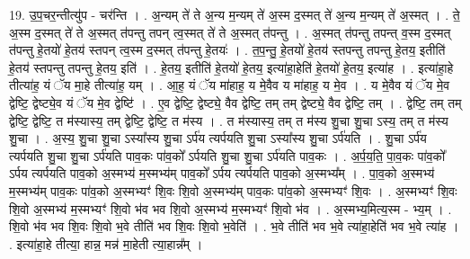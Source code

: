 \documentclass[17pt]{extarticle}
\begin{document}
19. उ॒प॒चर॒न्तीत्यु॑प - चर॑न्ति । . अ॒न्यम् ते॑ ते अ॒न्य म॒न्यम् ते॑ अ॒स्म द॒स्मत् ते॑ अ॒न्य म॒न्यम् ते॑ अ॒स्मत् । . ते॒ अ॒स्म द॒स्मत् ते॑ ते अ॒स्मत् त॑पन्तु तपन् त्व॒स्मत् ते॑ ते अ॒स्मत् त॑पन्तु । . अ॒स्मत् त॑पन्तु तपन्त् व॒स्म द॒स्मत् त॑पन्तु हे॒तयो॑ हे॒तय॑ स्तपन् त्व॒स्म द॒स्मत् त॑पन्तु हे॒तयः॑ । . त॒प॒न्तु॒ हे॒तयो॑ हे॒तय॑ स्तपन्तु तपन्तु हे॒तय॒ इतीति॑ हे॒तय॑ स्तपन्तु तपन्तु हे॒तय॒ इति॑ । . हे॒तय॒ इतीति॑ हे॒तयो॑ हे॒तय॒ इत्या॑हा॒हेति॑ हे॒तयो॑ हे॒तय॒ इत्या॑ह । . इत्या॑हा॒हे तीत्या॑ह॒ यं ॅय मा॒हे तीत्या॑ह॒ यम् । . आ॒ह॒ यं ॅय मा॑हाह॒ य मे॒वैव य मा॑हाह॒ य मे॒व । . य मे॒वैव यं ॅय मे॒व द्वेष्टि॒ द्वेष्ट्ये॒व यं ॅय मे॒व द्वेष्टि॑ । . ए॒व द्वेष्टि॒ द्वेष्ट्ये॒ वैव द्वेष्टि॒ तम् तम् द्वेष्ट्ये॒ वैव द्वेष्टि॒ तम् । . द्वेष्टि॒ तम् तम् द्वेष्टि॒ द्वेष्टि॒ त म॑स्यास्य॒ तम् द्वेष्टि॒ द्वेष्टि॒ त म॑स्य । . त म॑स्यास्य॒ तम् त म॑स्य शु॒चा शु॒चा ऽस्य॒ तम् त म॑स्य शु॒चा । . अ॒स्य॒ शु॒चा शु॒चा ऽस्या᳚स्य शु॒चा ऽर्प॑य त्यर्पयति शु॒चा ऽस्या᳚स्य शु॒चा ऽर्प॑यति । . शु॒चा ऽर्प॑य त्यर्पयति शु॒चा शु॒चा ऽर्प॑यति पाव॒कः पा॑व॒को᳚ ऽर्पयति शु॒चा शु॒चा ऽर्प॑यति पाव॒कः । . अ॒र्प॒य॒ति॒ पा॒व॒कः पा॑व॒को᳚ ऽर्पय त्यर्पयति पाव॒को अ॒स्मभ्य॑ म॒स्मभ्य॑म् पाव॒को᳚ ऽर्पय त्यर्पयति पाव॒को अ॒स्मभ्य᳚म् । . पा॒व॒को अ॒स्मभ्य॑ म॒स्मभ्य॑म् पाव॒कः पा॑व॒को अ॒स्मभ्यꣳ॑ शि॒वः शि॒वो अ॒स्मभ्य॑म् पाव॒कः पा॑व॒को अ॒स्मभ्यꣳ॑ शि॒वः । . अ॒स्मभ्यꣳ॑ शि॒वः शि॒वो अ॒स्मभ्य॑ म॒स्मभ्यꣳ॑ शि॒वो भ॑व भव शि॒वो अ॒स्मभ्य॑ म॒स्मभ्यꣳ॑ शि॒वो भ॑व । . अ॒स्मभ्य॒मित्य॒स्म - भ्य॒म् । . शि॒वो भ॑व भव शि॒वः शि॒वो भ॒वे तीति॑ भव शि॒वः शि॒वो भ॒वेति॑ । . भ॒वे तीति॑ भव भ॒वे त्या॑हा॒हेति॑ भव भ॒वे त्या॑ह । . इत्या॑हा॒हे तीत्या॒ हान्न॒ मन्न॑ मा॒हेती त्या॒हान्न᳚म् । \newline
\end{document}
